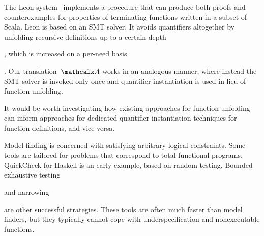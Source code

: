 The Leon system~\cite{blanc2013overview} implements a procedure that can
produce both proofs and counter\-examples for properties of terminating functions
written in a subset of Scala. Leon is based on an SMT solver. It avoids
quantifiers altogether by unfolding recursive definitions up to a certain
depth\begin{longv}, which is increased on a per-need basis\end{longv}.
Our translation~$\conv$ works in an analogous manner, 
where instead the SMT solver is invoked only once 
and quantifier instantiation is used in lieu of function unfolding.
\begin{longv}It would be
worth investigating how existing approaches for function
unfolding can inform approaches for dedicated quantifier instantiation
techniques for function definitions, and vice versa.\end{longv}

Model finding is concerned with satisfying arbitrary logical constraints. Some
tools are tailored for problems that correspond to total functional
programs. QuickCheck \cite{claessen-hughes-2000} for Haskell is an
early example, based on random testing. Bounded exhaustive testing\begin{longv}
\cite{runciman-et-al-2008}\end{longv} and narrowing\begin{longv}
\cite{lindblad-2008-testing}\end{longv} are other successful strategies. These
tools are often much faster than model finders, but they typically cannot cope
with underspecification and nonexecutable functions.




%
%
%

